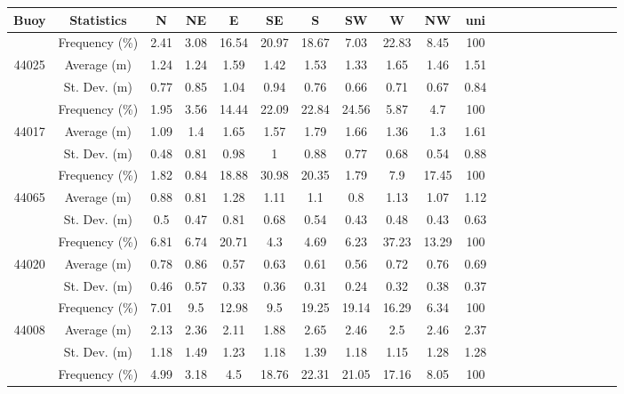 \begin{table}[H]
\begin{tabular*}{\textwidth}{c@{\hskip 0.07in}cccccccccc @{\extracolsep{\fill}} cccccccccc}
\toprule
    \textbf{Buoy} & \textbf{Statistics} &  \textbf{N} & \textbf{NE}  & \textbf{E} & \textbf{SE} &  \textbf{S} &  \textbf{SW}  &  \textbf{W}  &  \textbf{NW}  & \textbf{uni}  \\ \midrule
    ~     & Frequency (\%)  & 2.41  & 3.08 & 16.54 & 20.97 & 18.67 & 7.03  & 22.83 & 8.45  & 100  \\
    44025 & Average (m)   & 1.24  & 1.24 & 1.59  & 1.42  & 1.53  & 1.33  & 1.65  & 1.46  & 1.51 \\
    ~     & St. Dev. (m)  & 0.77  & 0.85 & 1.04  & 0.94  & 0.76  & 0.66  & 0.71  & 0.67  & 0.84 \\ \midrule
    ~     & Frequency (\%)  & 1.95  & 3.56 & 14.44 & 22.09 & 22.84 & 24.56 & 5.87  & 4.7   & 100  \\
    44017 & Average (m)   & 1.09  & 1.4  & 1.65  & 1.57  & 1.79  & 1.66  & 1.36  & 1.3   & 1.61 \\
    ~     & St. Dev. (m)  & 0.48  & 0.81 & 0.98  & 1     & 0.88  & 0.77  & 0.68  & 0.54  & 0.88 \\ \midrule
    ~     & Frequency (\%)  & 1.82  & 0.84 & 18.88 & 30.98 & 20.35 & 1.79  & 7.9   & 17.45 & 100  \\
    44065 & Average (m)   & 0.88  & 0.81 & 1.28  & 1.11  & 1.1   & 0.8   & 1.13  & 1.07  & 1.12 \\
    ~     & St. Dev. (m)  & 0.5   & 0.47 & 0.81  & 0.68  & 0.54  & 0.43  & 0.48  & 0.43  & 0.63 \\ \midrule
    ~     & Frequency (\%)  & 6.81  & 6.74 & 20.71 & 4.3   & 4.69  & 6.23  & 37.23 & 13.29 & 100  \\
    44020 & Average (m)   & 0.78  & 0.86 & 0.57  & 0.63  & 0.61  & 0.56  & 0.72  & 0.76  & 0.69 \\
    ~     & St. Dev. (m)  & 0.46  & 0.57 & 0.33  & 0.36  & 0.31  & 0.24  & 0.32  & 0.38  & 0.37 \\ \midrule
    ~     & Frequency (\%)  & 7.01  & 9.5  & 12.98 & 9.5   & 19.25 & 19.14 & 16.29 & 6.34  & 100  \\
    44008 & Average (m)   & 2.13  & 2.36 & 2.11  & 1.88  & 2.65  & 2.46  & 2.5   & 2.46  & 2.37 \\
    ~     & St. Dev. (m)  & 1.18  & 1.49 & 1.23  & 1.18  & 1.39  & 1.18  & 1.15  & 1.28  & 1.28 \\ \midrule
    ~     & Frequency (\%)  & 4.99  & 3.18 & 4.5   & 18.76 & 22.31 & 21.05 & 17.16 & 8.05  & 100  \\

\end{tabular*}
\end{table}
